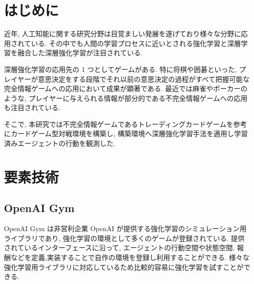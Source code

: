 \documentclass[twocolumn]{jarticle}
\begin{document}

\section{はじめに}
近年, 人工知能に関する研究分野は目覚ましい発展を遂げており様々な分野に応用されている. その中でも人間の学習プロセスに近いとされる強化学習と深層学習を融合した深層強化学習が注目されている.\par
深層強化学習の応用先の 1 つとしてゲームがある.
特に将棋や囲碁といった, プレイヤーが意思決定をする段階でそれ以前の意思決定の過程がすべて把握可能な完全情報ゲームへの応用において成果が顕著である. 
最近では麻雀やポーカーのような, プレイヤーに与えられる情報が部分的である不完全情報ゲームへの応用も注目されている.
\par
そこで, 本研究では不完全情報ゲームであるトレーディングカードゲームを参考にカードゲーム型対戦環境を構築し, 構築環境へ深層強化学習手法を適用し学習済みエージェントの行動を観測した. 

\section{要素技術}

\subsection{OpenAI Gym}
OpenAI Gym \cite{OpenAIGym} は非営利企業 OpenAI が提供する強化学習のシミュレーション用ライブラリであり, 強化学習の環境として多くのゲームが登録されている. 提供されているインターフェースに沿って, エージェントの行動空間や状態空間, 報酬などを定義,実装することで自作の環境を登録し利用することができる. 様々な強化学習用ライブラリに対応しているため比較的容易に強化学習を試すことができる.
\end{document}
